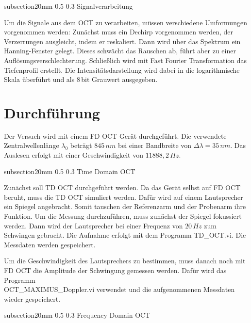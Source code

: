 \documentclass[german, %
parskip=full, %
bibliography=totoc, %
]{scrartcl}
\makeatletter
\renewcommand\subsection{\@startsection 
   {subsection}{2}{0mm}%
   {0.5\baselineskip}%
   {0.3\baselineskip}%
   {\bfseries\sffamily\large}%
   }
\makeatother
\begin{document}
\subsection{Signalverarbeitung}

Um die Signale aus dem OCT zu verarbeiten, müssen verschiedene Umformungen vorgenommen werden: Zunächst muss ein Dechirp vorgenommen werden, der Verzerrungen ausgleicht, indem er reskaliert. Dann wird über das Spektrum ein Hanning-Fenster gelegt. Dieses schwächt das Rauschen ab, führt aber zu einer Auflösungsverschlechterung. Schließlich wird mit Fast Fourier Transformation das Tiefenprofil erstellt. Die Intensitätsdarstellung wird dabei in die logarithmische Skala überführt und als 8\,bit Grauwert ausgegeben.

\section{Durchführung}

Der Versuch wird mit einem FD OCT-Gerät durchgeführt. Die verwendete Zentralwellenlänge $\lambda_0$ beträgt $845\,nm$ bei einer Bandbreite von $\Delta \lambda = 35\,nm$. Das Auslesen erfolgt mit einer Geschwindigkeit von $11888,2\,Hz$.

\subsection{Time Domain OCT}

Zunächst soll TD OCT durchgeführt werden. Da das Gerät selbst auf FD OCT beruht, muss die TD OCT simuliert werden. Dafür wird auf einem Lautsprecher ein Spiegel angebracht. Somit tauschen der Referenzarm und der Probenarm ihre Funktion. Um die Messung durchzuführen, muss zunächst der Spiegel fokussiert werden. Dann wird der Lautsprecher bei einer Frequenz von $20\,Hz$ zum Schwingen gebracht. Die Aufnahme erfolgt mit dem Programm TD\_OCT.vi. Die Messdaten werden gespeichert.

Um die Geschwindigkeit des Lautsprechers zu bestimmen, muss danach noch mit FD OCT die Amplitude der Schwingung gemessen werden. Dafür wird das Programm \\ OCT\_MAXIMUS\_Doppler.vi verwendet und die aufgenommenen Messdaten wieder gespeichert. 

\subsection{Frequency Domain OCT}
\end{document}
